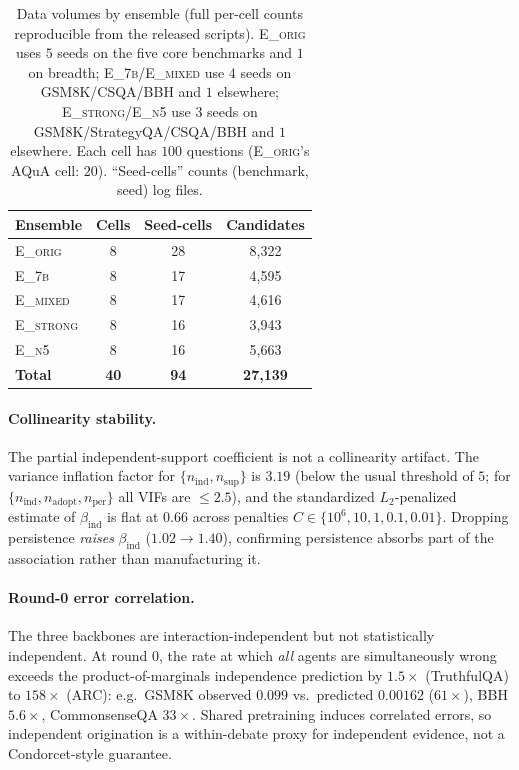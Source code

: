 \begin{table}[h]
\centering\small
\caption{Data volumes by ensemble (full per-cell counts reproducible from the released scripts).
\textsc{E\_orig} uses $5$ seeds on the five core benchmarks and $1$ on breadth; \textsc{E\_7b}/\textsc{E\_mixed}
use $4$ seeds on GSM8K/CSQA/BBH and $1$ elsewhere; \textsc{E\_strong}/\textsc{E\_n5} use $3$ seeds on GSM8K/StrategyQA/CSQA/BBH and $1$ elsewhere. Each
cell has $100$ questions (\textsc{E\_orig}'s AQuA cell: $20$). ``Seed-cells'' counts (benchmark, seed) log files.}
\label{tab:counts}
\begin{tabular}{lccc}
\toprule
Ensemble & Cells & Seed-cells & Candidates \\
\midrule
\textsc{E\_orig}   & 8 & 28 & 8{,}322 \\
\textsc{E\_7b}     & 8 & 17 & 4{,}595 \\
\textsc{E\_mixed}  & 8 & 17 & 4{,}616 \\
\textsc{E\_strong} & 8 & 16 & 3{,}943 \\
\textsc{E\_n5}     & 8 & 16 & 5{,}663 \\
\midrule
\textbf{Total} & \textbf{40} & \textbf{94} & \textbf{27{,}139} \\
\bottomrule
\end{tabular}
\end{table}

\paragraph{Collinearity stability.}
The partial independent-support coefficient is not a collinearity artifact. The variance inflation factor for
$\{n_{\mathrm{ind}},n_{\mathrm{sup}}\}$ is $3.19$ (below the usual threshold of $5$; for
$\{n_{\mathrm{ind}},n_{\mathrm{adopt}},n_{\mathrm{per}}\}$ all VIFs are $\le 2.5$), and the standardized
$L_2$-penalized estimate of $\beta_{\mathrm{ind}}$ is flat at $0.66$ across penalties
$C\in\{10^6,10,1,0.1,0.01\}$. Dropping persistence \emph{raises} $\beta_{\mathrm{ind}}$ ($1.02\to1.40$),
confirming persistence absorbs part of the association rather than manufacturing it.

\paragraph{Round-0 error correlation.}
The three backbones are interaction-independent but not statistically independent. At round $0$, the rate at
which \emph{all} agents are simultaneously wrong exceeds the product-of-marginals independence prediction by
$1.5\times$ (TruthfulQA) to $158\times$ (ARC): e.g.\ GSM8K observed $0.099$ vs.\ predicted $0.00162$
($61\times$), BBH $5.6\times$, CommonsenseQA $33\times$. Shared pretraining induces correlated errors, so
independent origination is a within-debate proxy for independent evidence, not a Condorcet-style guarantee.

